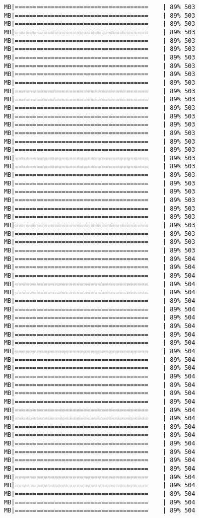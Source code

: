 \documentclass[
]{article}
\begin{document}
\begin{verbatim}
MB|=====================================    | 89% 503 MB|=====================================    | 89% 503 MB|=====================================    | 89% 503 MB|=====================================    | 89% 503 MB|=====================================    | 89% 503 MB|=====================================    | 89% 503 MB|=====================================    | 89% 503 MB|=====================================    | 89% 503 MB|=====================================    | 89% 503 MB|=====================================    | 89% 503 MB|=====================================    | 89% 503 MB|=====================================    | 89% 503 MB|=====================================    | 89% 503 MB|=====================================    | 89% 503 MB|=====================================    | 89% 503 MB|=====================================    | 89% 503 MB|=====================================    | 89% 503 MB|=====================================    | 89% 503 MB|=====================================    | 89% 503 MB|=====================================    | 89% 503 MB|=====================================    | 89% 503 MB|=====================================    | 89% 503 MB|=====================================    | 89% 503 MB|=====================================    | 89% 503 MB|=====================================    | 89% 503 MB|=====================================    | 89% 503 MB|=====================================    | 89% 503 MB|=====================================    | 89% 503 MB|=====================================    | 89% 503 MB|=====================================    | 89% 503 MB|=====================================    | 89% 504 MB|=====================================    | 89% 504 MB|=====================================    | 89% 504 MB|=====================================    | 89% 504 MB|=====================================    | 89% 504 MB|=====================================    | 89% 504 MB|=====================================    | 89% 504 MB|=====================================    | 89% 504 MB|=====================================    | 89% 504 MB|=====================================    | 89% 504 MB|=====================================    | 89% 504 MB|=====================================    | 89% 504 MB|=====================================    | 89% 504 MB|=====================================    | 89% 504 MB|=====================================    | 89% 504 MB|=====================================    | 89% 504 MB|=====================================    | 89% 504 MB|=====================================    | 89% 504 MB|=====================================    | 89% 504 MB|=====================================    | 89% 504 MB|=====================================    | 89% 504 MB|=====================================    | 89% 504 MB|=====================================    | 89% 504 MB|=====================================    | 89% 504 MB|=====================================    | 89% 504 MB|=====================================    | 89% 504 MB|=====================================    | 89% 504 MB|=====================================    | 89% 504 MB|=====================================    | 89% 504 MB|=====================================    | 89% 504 MB|=====================================    | 89% 504 
\end{verbatim}
\end{document}

